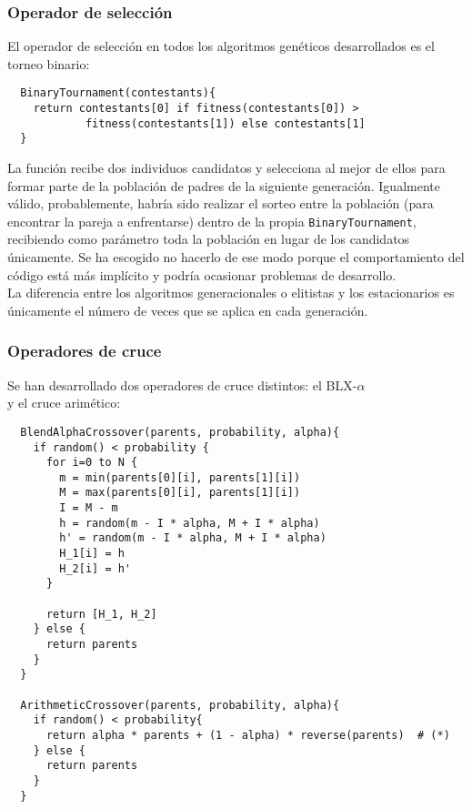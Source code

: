 \documentclass[11pt]{article}
\theoremstyle{plain}
\theoremstyle{definition}
\begin{document}
\subsubsection{Operador de selección}

El operador de selección en todos los algoritmos genéticos desarrollados es el
torneo binario: \\

\begin{lstlisting}
  BinaryTournament(contestants){
    return contestants[0] if fitness(contestants[0]) >
            fitness(contestants[1]) else contestants[1]
  }
\end{lstlisting}

La función recibe dos individuos candidatos y selecciona al mejor de ellos para formar parte de la
población de padres de la siguiente generación. Igualmente válido, probablemente, habría sido realizar el sorteo entre la población (para encontrar la pareja a enfrentarse) dentro de la propia \texttt{BinaryTournament}, recibiendo como parámetro toda la población en lugar de los candidatos únicamente. Se ha escogido no hacerlo de ese modo porque el comportamiento del código está más implícito y podría ocasionar problemas de desarrollo. \\
La diferencia entre
los algoritmos generacionales o elitistas y los estacionarios es únicamente el número de veces que se aplica en cada generación. \\

\subsubsection{Operadores de cruce}

Se han desarrollado dos operadores de cruce distintos: el BLX-$\alpha$ \\
y el cruce arimético:

\begin{lstlisting}
  BlendAlphaCrossover(parents, probability, alpha){
    if random() < probability {
      for i=0 to N {
        m = min(parents[0][i], parents[1][i])
        M = max(parents[0][i], parents[1][i])
        I = M - m
        h = random(m - I * alpha, M + I * alpha)
        h' = random(m - I * alpha, M + I * alpha)
        H_1[i] = h
        H_2[i] = h'
      }

      return [H_1, H_2]
    } else {
      return parents
    }
  }

  ArithmeticCrossover(parents, probability, alpha){
    if random() < probability{
      return alpha * parents + (1 - alpha) * reverse(parents)  # (*)
    } else {
      return parents
    }
  }
\end{lstlisting}
\end{document}
